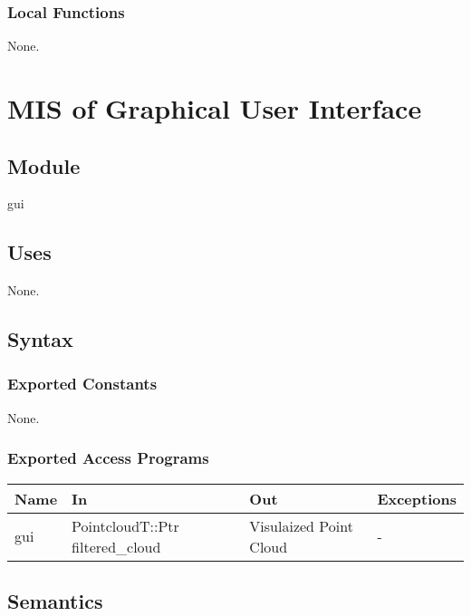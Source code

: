 \documentclass[12pt, titlepage]{article}
\begin{document}
\subsubsection{Local Functions}

None.

\newpage

\section{MIS of Graphical User Interface} \label{ModuleGUI} 

\subsection{Module}

gui

\subsection{Uses}

None.

\subsection{Syntax}

\subsubsection{Exported Constants}

None.

\subsubsection{Exported Access Programs}

\begin{center}
\begin{tabular}{p{2cm} p{3cm} p{3cm} p{3cm}}
\hline
\textbf{Name} & \textbf{In} & \textbf{Out} & \textbf{Exceptions} \\
\hline
gui & PointcloudT::Ptr filtered\_cloud & Visulaized Point Cloud & - \\
\hline
\end{tabular}
\end{center}

\subsection{Semantics}
\end{document}
